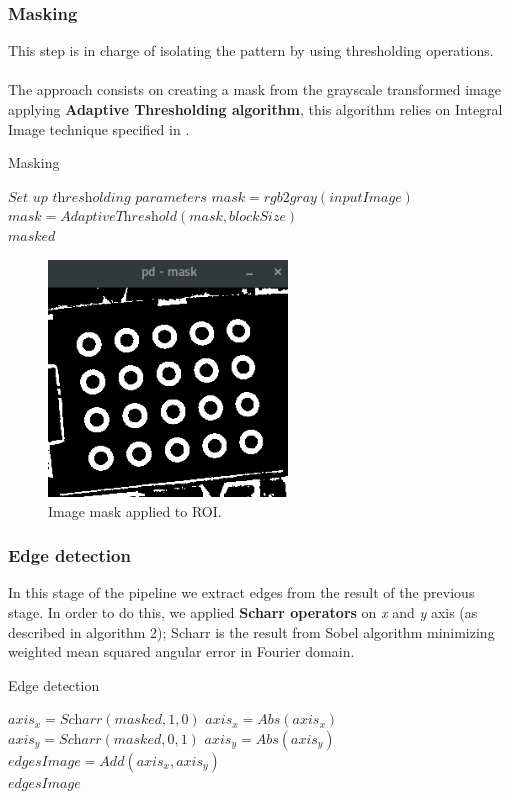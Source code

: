 \documentclass[journal]{IEEEtran}
\begin{document}
\subsubsection{ Masking }
This step is in charge of isolating the pattern by using thresholding operations.
\\
\\
The approach consists on creating a mask from the grayscale transformed image applying \textbf{Adaptive Thresholding algorithm}, this algorithm relies on Integral Image technique specified in \cite{IntegralImageThresholding}.
\begin{algorithm}
\caption{Masking}
\label{alg:mask2}
\begin{algorithmic}[1]
\State $\textit{Set up thresholding parameters}$
\State $mask   = \textit{rgb2gray}( inputImage )$
\State $mask   = \textit{AdaptiveThreshold}(mask, blockSize)$\\
\Return $masked$
\end{algorithmic}
\end{algorithm}
\begin{figure}[H]
\centering
\includegraphics[width=2.5in]{_img/img_report2_mask.png}
\caption{Image mask applied to ROI.}
\end{figure}

\subsubsection{Edge detection}
In this stage of the pipeline we extract edges from the result of the previous stage. In order to do this, we applied \textbf{Scharr operators} on \textit{x} and \textit{y} axis (as described in algorithm 2); Scharr is the result from Sobel algorithm minimizing weighted mean squared angular error in Fourier domain.
\begin{algorithm}
\caption{Edge detection}
\begin{algorithmic}[1]
\State $axis_x   = \textit{Scharr}(masked, 1, 0)$
\State $axis_x   = \textit{Abs}(axis_x)$
\State $axis_y   = \textit{Scharr}(masked, 0, 1)$
\State $axis_y   = \textit{Abs}(axis_y)$
\State $edgesImage   = \textit{Add}(axis_x, axis_y)$ \\
\Return $edgesImage$
\end{algorithmic}
\end{algorithm}
\end{document}
